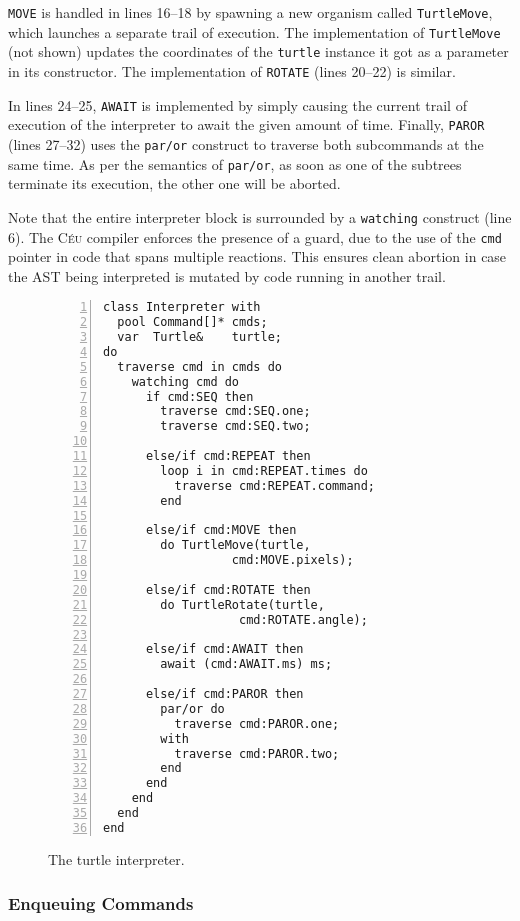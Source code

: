 \documentclass{acm_proc_article-sp}
\newcommand{\CEU}{\textsc{C\'{e}u}\xspace}
\newcommand{\code}[1] {{\small{\texttt{#1}}}}
\begin{document}
\code{MOVE} is handled in lines 16--18 by spawning a new organism called
\code{TurtleMove}, which launches a separate trail of execution. The
implementation of \code{TurtleMove} (not shown) updates the coordinates of the
\code{turtle} instance it got as a parameter in its constructor. The
implementation of \code{ROTATE} (lines 20--22) is similar.

In lines 24--25, \code{AWAIT} is implemented by simply causing the current
trail of execution of the interpreter to await the given amount of time.
Finally, \code{PAROR} (lines 27--32) uses the \code{par/or} construct
to traverse both subcommands at the same time. As per the semantics of
\code{par/or}, as soon as one of the subtrees terminate its execution,
the other one will be aborted.

Note that the entire interpreter block is surrounded by a \code{watching}
construct (line 6). The \CEU compiler enforces the presence of a guard, 
due to the use of the \code{cmd} pointer in code that spans multiple
reactions. This ensures clean abortion in case the AST being interpreted
is mutated by code running in another trail.

\begin{figure}%
\begin{lstlisting}[numbers=left,xleftmargin=3em]
class Interpreter with
  pool Command[]* cmds;
  var  Turtle&    turtle;
do
  traverse cmd in cmds do
    watching cmd do
      if cmd:SEQ then
        traverse cmd:SEQ.one;
        traverse cmd:SEQ.two;

      else/if cmd:REPEAT then
        loop i in cmd:REPEAT.times do
          traverse cmd:REPEAT.command;
        end

      else/if cmd:MOVE then
        do TurtleMove(turtle,
                  cmd:MOVE.pixels);

      else/if cmd:ROTATE then
        do TurtleRotate(turtle,
                   cmd:ROTATE.angle);

      else/if cmd:AWAIT then
        await (cmd:AWAIT.ms) ms;

      else/if cmd:PAROR then
        par/or do
          traverse cmd:PAROR.one;
        with
          traverse cmd:PAROR.two;
        end
      end
    end
  end
end
\end{lstlisting}
\caption{ The turtle interpreter.
\label{lst.turtle.interpreter}
}
\end{figure}

\subsubsection{Enqueuing Commands}
\end{document}
